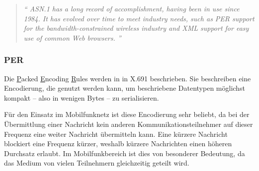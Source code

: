 \cite{asn:itu:asn.1}
\begin{quotation}
	\textit{\enquote{
		ASN.1 has a long record of accomplishment, having been in use since 1984. It has evolved over time to meet industry needs, such as PER support for the bandwidth-constrained wireless industry and XML support for easy use of common Web browsers.
	}}
	\cite{asn:itu:asn.1}
\end{quotation}

\subsubsection{PER}

Die \underline{P}acked \underline{E}ncoding \underline{R}ules werden in in X.691 \cite{asn:itu:x691} beschrieben.
Sie beschreiben eine Encodierung, die genutzt werden kann, um beschriebene Datentypen möglichst kompakt -- also in wenigen Bytes -- zu serialisieren.

Für den Einsatz im Mobilfunknetz ist diese Encodierung sehr beliebt, da bei der Übermittlung einer Nachricht kein anderen Kommunikationsteilnehmer auf dieser Frequenz eine weiter Nachricht übermitteln kann.
Eine kürzere Nachricht blockiert eine Frequenz kürzer, weshalb kürzere Nachrichten einen höheren Durchsatz erlaubt.
Im Mobilfunkbereich ist dies von besonderer Bedeutung, da das Medium von vielen Teilnehmern gleichzeitig geteilt wird. 